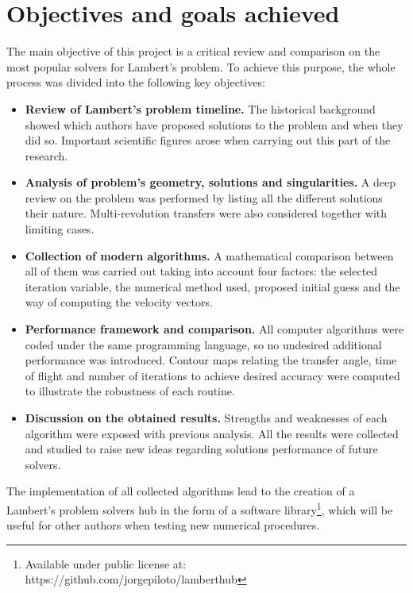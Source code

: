 \section{Objectives and goals achieved}

The main objective of this project is a critical review and comparison on the
most popular solvers for Lambert's problem. To achieve this purpose, the
whole process was divided into the following key objectives:

\begin{itemize}

  \item \textbf{Review of Lambert's problem timeline.}
        The historical background showed which authors have proposed solutions
        to the problem and when they did so. Important scientific
        figures arose when carrying out this part of the research.

  \item \textbf{Analysis of problem's geometry, solutions and singularities.}
        A deep review on the problem was performed by listing all the
        different solutions their nature.  Multi-revolution transfers were also
        considered together with limiting cases.

  \item \textbf{Collection of modern algorithms.}
        A mathematical comparison between all of them was carried out taking
        into account four factors: the selected iteration variable, the
        numerical method used, proposed initial guess and the way of
        computing the velocity vectors.


  \item \textbf{Performance framework and comparison.}
        All computer algorithms were coded under the same programming language,
        so no undesired additional performance was introduced.  Contour
        maps relating the transfer angle, time of flight and number of
        iterations to achieve desired accuracy were computed to
        illustrate the robustness of each routine.

  \item \textbf{Discussion on the obtained results.}
        Strengths and weaknesses of each algorithm were exposed with previous
        analysis. All the results were collected and studied to raise
        new ideas regarding solutions performance of future solvers.

\end{itemize}

The implementation of all collected algorithms lead to the creation of a
Lambert's problem solvers hub in the form of a software
library\footnote{Available under public license at:
  https://github.com/jorgepiloto/lamberthub}, which will be useful for other
authors when testing new numerical procedures.
